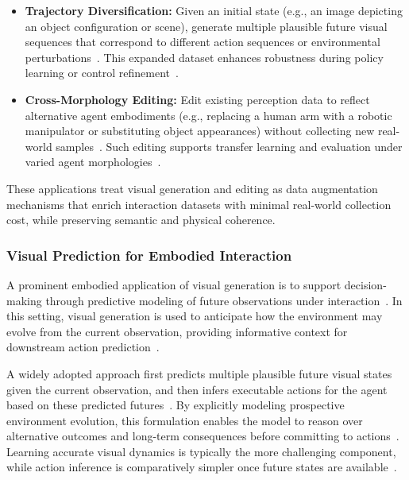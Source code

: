 \documentclass{llmxive}
\begin{document}
\begin{itemize}
    \item \textbf{Trajectory Diversification:} Given an initial state (e.g., an image depicting an object configuration or scene), generate multiple plausible future visual sequences that correspond to different action sequences or environmental perturbations~\citep{zhu2024irasim,fu2025robomaster,zhou2024robodreamer,barcellona2024dreamtomanipulate}. This expanded dataset enhances robustness during policy learning or control refinement~\citep{zhu2024irasim,zhou2024robodreamer}.
    
    \item \textbf{Cross-Morphology Editing:} Edit existing perception data to reflect alternative agent embodiments (e.g., replacing a human arm with a robotic manipulator or substituting object appearances) without collecting new real-world samples~\citep{chen2024roviaug,lepert2025phantom,li2025h2r,lepert2025masquerade,fan2026robopaint,song2025mitty}. Such editing supports transfer learning and evaluation under varied agent morphologies~\citep{chen2024roviaug,li2025h2r}.
\end{itemize}

These applications treat visual generation and editing as data augmentation mechanisms that enrich interaction datasets with minimal real-world collection cost, while preserving semantic and physical coherence.

\subsubsection{Visual Prediction for Embodied Interaction}

A prominent embodied application of visual generation is to support decision-making through predictive modeling of future observations under interaction~\citep{zhu2024irasim,hu2024vpp,li2025uva,zhu2025uwm}. In this setting, visual generation is used to anticipate how the environment may evolve from the current observation, providing informative context for downstream action prediction~\citep{zhu2024irasim,hu2024vpp}.

A widely adopted approach first predicts multiple plausible future visual states given the current observation, and then infers executable actions for the agent based on these predicted futures~\citep{zhao2025cotvla,tian2024predictive,du2023unipi,ko2024actionlessvideos,chen2025largevideoplanner}. By explicitly modeling prospective environment evolution, this formulation enables the model to reason over alternative outcomes and long-term consequences before committing to actions~\citep{du2023unipi,chen2025largevideoplanner,zhou2024robodreamer}. Learning accurate visual dynamics is typically the more challenging component, while action inference is comparatively simpler once future states are available~\citep{zhu2024irasim,tian2024predictive,hu2024vpp}.
\end{document}
